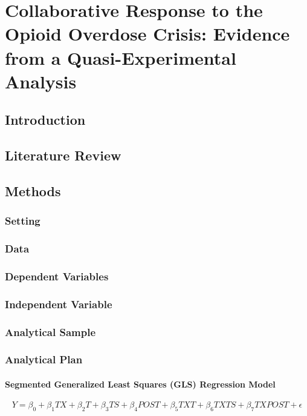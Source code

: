 \chapter{Collaborative Response to the Opioid Overdose Crisis: Evidence from a Quasi-Experimental Analysis}

\section{Introduction}
\section{Literature Review}
\subsection{}
\section{Methods}
\subsection{Setting}
\subsection{Data}
\subsection{Dependent Variables}
\subsection{Independent Variable}
\subsection{Analytical Sample}
\subsection{Analytical Plan}
\subsubsection{Segmented Generalized Least Squares (GLS) Regression Model}

\[Y = \beta_0 + \beta_1 TX + \beta_2 T + \beta_3 TS + \beta_4 POST + \beta_5 TXT + \beta_6 TXTS + \beta_7 TXPOST + \epsilon \]

